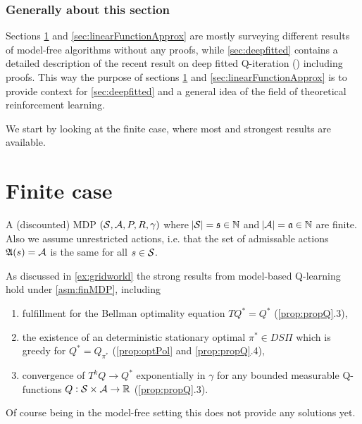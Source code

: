 \subsubsection{Generally about this section}

Sections \ref{sec:hiddenFinite} and \ref{sec:linearFunctionApprox} are mostly surveying
different results of model-free algorithms without any proofs,
while \cref{sec:deepfitted} contains a detailed description of 
the recent result on deep fitted Q-iteration () including
proofs.
This way the purpose of sections
\ref{sec:hiddenFinite} and \ref{sec:linearFunctionApprox} 
is to provide context for \cref{sec:deepfitted} and a general idea of 
the field of theoretical reinforcement learning.

We start by looking at the finite case, where most and strongest results
are available.

\section{Finite case} \label{sec:hiddenFinite}

\begin{sett}
  A (discounted) MDP $(\mathcal{S}, \mathcal{A}, P, R, \gamma)$ where
  $\abs{\mathcal{S}} = \frak{s} \in \mathbb{N}$ and $\abs{\mathcal{A}} = \frak{a} \in \mathbb{N}$
  are finite.
  Also we assume unrestricted actions, i.e. that the set of admissable
  actions $\frak{A}(s) = \mathcal{A}$ is the same for all $s \in \mathcal{S}$.
  \label{asm:finMDP}
\end{sett}

\begin{rem}
  As discussed in \cref{ex:gridworld} the strong results from model-based
  Q-learning hold under \cref{asm:finMDP},
  including
  \begin{enumerate}
    \item fulfillment for the Bellman optimality equation $T Q^* = Q^*$
      (\cref{prop:propQ}.3),
    \item the existence of an deterministic stationary optimal
      $\pi^* \in DS\Pi$ which is greedy for $Q^* = Q_{\pi^*}$
      (\cref{prop:optPol} and \cref{prop:propQ}.4),
    \item convergence of $T^k Q \to Q^*$ exponentially in $\gamma$
      for any bounded measurable Q-functions $Q : \mathcal{S} \times \mathcal{A} \to \mathbb{R}$
      (\cref{prop:propQ}.3).
  \end{enumerate}
  Of course being in the model-free setting this does not provide any
  solutions yet.
\end{rem}

